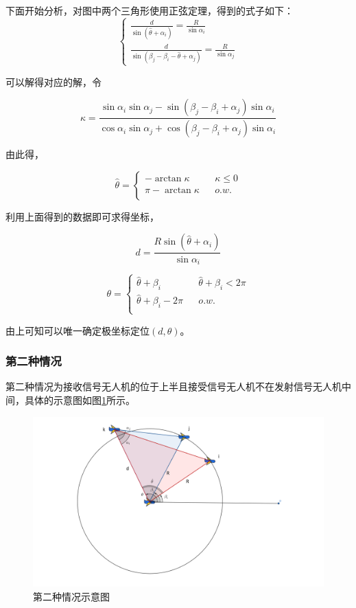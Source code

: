 \documentclass[withoutpreface,bwprint]{cumcmthesis} %
\begin{document}
下面开始分析，对图中两个三角形使用正弦定理，得到的式子如下：
\begin{equation}
\left\{\begin{array}{l}
\frac{d}{\sin \left(\hat{\theta} + \alpha_i\right)}=\frac{R}{\sin \alpha_i} \\
\frac{d}{\sin \left(\beta_j - \beta_i - \hat{\theta} + \alpha_j \right)}=\frac{R}{\sin \alpha_j}
\end{array}\right.
\end{equation}

可以解得对应的解，令 

$$\kappa = \frac{\sin \alpha_i \sin \alpha_j - \sin (\beta_j - \beta_i + \alpha_j) \sin \alpha_i}{\cos \alpha_i \sin \alpha_j + \cos(\beta_j - \beta_i + \alpha_j) \sin \alpha_i}$$

由此得，

$$ 
\hat{\theta}=\left\{
\begin{array}{lcl}
- \arctan \kappa & & {\kappa \leq 0} \\
\pi - \arctan \kappa & & {o.w.}\\
\end{array} \right. 
$$

利用上面得到的数据即可求得坐标，

$$ d = \frac{R \sin(\hat{\theta}+\alpha_i )}{\sin \alpha_i}$$

$$ 
\theta=\left\{
\begin{array}{lcl}
\hat{\theta}+\beta_i & & {\hat{\theta}+\beta_i < 2\pi} \\
\hat{\theta}+\beta_i - 2\pi & & {o.w.}\\
\end{array} \right. 
$$

由上可知可以唯一确定极坐标定位$(d,\theta)$。

\subsubsection{第二种情况}

第二种情况为接收信号无人机的位于上半且接受信号无人机不在发射信号无人机中间，具体的示意图如图\ref{fig:case2}所示。

\begin{figure}[H]
    \centering
    \includegraphics[width=1.0\textwidth]{figures/case 2.png}
    \caption{第二种情况示意图}
    \label{fig:case2}
    
\end{figure}
\end{document}
